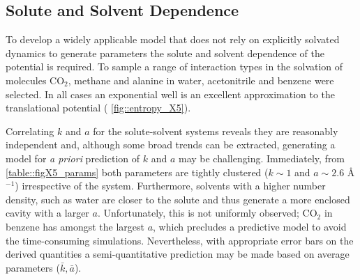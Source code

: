 \documentclass[../main.tex]{subfiles}
\begin{document}
\subsection{Solute and Solvent Dependence}

To develop a  widely applicable model that does not rely on explicitly solvated dynamics to generate parameters the solute and solvent dependence of the potential is required. To sample a range of interaction types in the solvation of  molecules CO$_2$, methane and alanine in water, acetonitrile and benzene were selected. In all cases an exponential well is an excellent approximation to the translational potential (\figurename{ \ref{fig::entropy_X5}}). 

Correlating $k$ and $a$ for the solute-solvent systems reveals they are reasonably independent and, although some broad trends can be extracted, generating a model for \emph{a priori} prediction of $k$ and $a$ may be challenging. Immediately, from \tablename{ \ref{table::figX5_params}} both parameters are tightly clustered ($k \sim 1$ \kcal and $a \sim 2.6 $ \AA$^{-1}$) irrespective of the system. Furthermore, solvents with a higher number density, such as water are  closer to the solute and thus generate a more enclosed cavity with a larger $a$. Unfortunately, this is not uniformly observed; CO$_2$ in benzene has amongst the largest $a$, which precludes a predictive model to avoid the time-consuming simulations. Nevertheless, with appropriate error bars on the derived quantities a semi-quantitative prediction may be made based on average parameters ($\bar{k}, \bar{a}$). 
\end{document}
